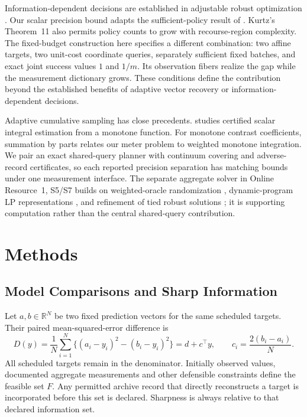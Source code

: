 \documentclass[12pt]{article}
\begin{document}
Information-dependent decisions are established in adjustable robust
optimization \citep{wei2024,ddid}. Our scalar precision bound adapts the
sufficient-policy result of \citet[Theorem~2 and Example~5]{kurtz2026}.
Kurtz's Theorem~11 also permits policy counts to grow with recourse-region
complexity. The fixed-budget construction here specifies a different
combination: two affine targets, two unit-cost coordinate queries, separately
sufficient fixed batches, and exact joint success values $1$ and $1/m$.
Its observation fibers realize the gap while the measurement dictionary
grows. These conditions define the contribution beyond the established
benefits of adaptive vector recovery or information-dependent decisions.

Adaptive cumulative sampling has close precedents.
\citet[Section~4.1.1, Corollary~1 and Theorem~3]{gaillard2023} studies
certified scalar integral estimation from a monotone function. For monotone
contrast coefficients, summation by parts relates our meter problem to
weighted monotone integration. We pair an exact shared-query planner with
continuum covering and adverse-record certificates, so each reported
precision separation has matching bounds under one measurement interface.
The separate aggregate solver in Online Resource~1, S5/S7 builds on
weighted-oracle randomization \citep{kawase2024}, dynamic-program LP
representations \citep{martin1990}, and refinement of tied robust solutions
\citep{iancu2014}; it is supporting computation rather than the central
shared-query contribution.

\section{Methods}\label{sec:methods}
\subsection{Model Comparisons and Sharp Information}
Let $a,b\in\mathbb R^N$ be two fixed prediction vectors for the same
scheduled targets. Their paired mean-squared-error difference is
\begin{equation}
 D(y)=\frac1N\sum_{i=1}^N\{(a_i-y_i)^2-(b_i-y_i)^2\}
 =d+c^\top y,\qquad c_i=\frac{2(b_i-a_i)}N.
 \label{eq:linear}
\end{equation}
All scheduled targets remain in the denominator. Initially observed values,
documented aggregate measurements and other defensible constraints define
the feasible set $F$. Any permitted archive record that directly reconstructs
a target is incorporated before this set is declared. Sharpness is always
relative to that declared information set.
\end{document}
